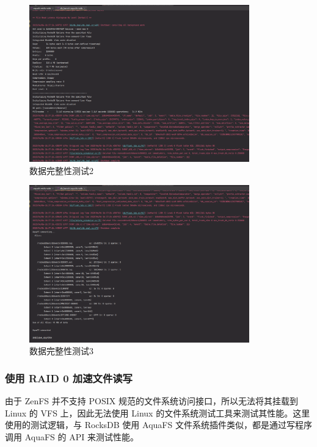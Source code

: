 \begin{figure}[htbp]
  \centering
  \includegraphics[width=0.85\textwidth]{fig/raid-data-check2.png}
  \caption{ 数据完整性测试2 }
  \label{check-data2}
\end{figure}

\begin{figure}[htbp]
  \centering
  \includegraphics[width=0.85\textwidth]{fig/raid-data-check3.png}
  \caption{ 数据完整性测试3 }
  \label{check-data3}
\end{figure}

\subsubsection{使用 RAID 0 加速文件读写}

由于 ZenFS 并不支持 POSIX 规范的文件系统访问接口，所以无法将其挂载到 Linux 的 VFS 上，因此无法使用 Linux 的文件系统测试工具来测试其性能。这里使用的测试逻辑，与 RocksDB 使用 AquaFS 文件系统插件类似，都是通过写程序调用 AquaFS 的 API 来测试性能。

